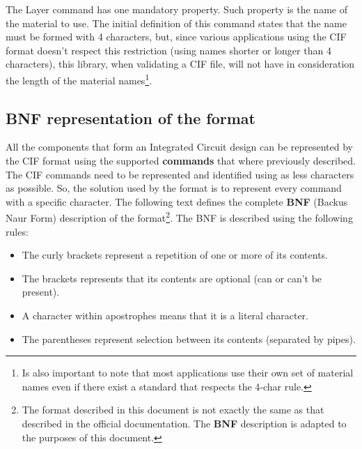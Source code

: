 \documentclass[11pt,twoside,openany,x11names,svgnames]{memoir}
\begin{document}
The Layer command has one mandatory property. Such property is the name of the material to use. The initial definition of this command states that the name must be formed with 4 characters, but, since various applications using the CIF format doesn't respect this restriction (using names shorter or longer than 4 characters), this library, when validating a CIF file, will not have in consideration the length of the material names\footnote{Is also important to note that most applications use their own set of material names even if there exist a standard that respects the 4-char rule.}.

\subsection{BNF representation of the format}\label{BNF-representation-of-the-format}

All the components that form an Integrated Circuit design can be represented by the CIF format using the supported \textbf{commands} that where previously described. The CIF commands need to be represented and identified using as less characters as possible. So, the solution used by the format is to represent every command with a specific character. The following text defines the complete \textbf{BNF} (Backus Naur Form) description of the format\footnote{The format described in this document is not exactly the same as that described in the official documentation. The \textbf{BNF} description is adapted to the purposes of this document.}. The BNF is described using the following rules:

\begin{itemize}
\item The curly brackets represent a repetition of one or more of its contents.
\item The brackets represents that its contents are optional (can or can't be present).
\item A character within apostrophes means that it is a literal character.
\item The parentheses represent selection between its contents (separated by pipes).
\end{itemize}
\end{document}
